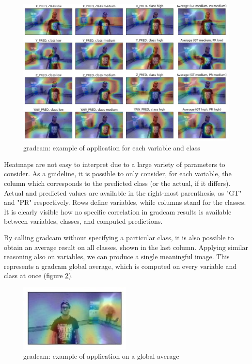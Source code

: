 \begin{figure}[!h]
	\centering
	\includegraphics[width=1\textwidth]{"contents/images/gradcam/04-gradcam-example-1"}
	\caption[\gls{gradcam}: example of application for each variable and class]{\gls{gradcam}: example of application for each variable and class}
	\label{fig:gradcam-example-1}
\end{figure}

Heatmaps are not easy to interpret due to a large variety of parameters to consider. As a guideline, it is possible to only consider, for each variable, the column which corresponds to the predicted class (or the actual, if it differs). Actual and predicted values are available in the right-most parenthesis, as "GT" and "PR" respectively. Rows define variables, while columns stand for the classes. It is clearly visible how no specific correlation in \gls{gradcam} results is available between variables, classes, and computed predictions.

By calling \gls{gradcam} without specifying a particular class, it is also possible to obtain an average result on all classes, shown in the last column. Applying similar reasoning also on variables, we can produce a single meaningful image. This represents a \gls{gradcam} global average, which is computed on every variable and class at once (figure \ref{fig:gradcam-example-2}).

\begin{figure}[!h]
	\centering
	\includegraphics[width=0.5\textwidth]{"contents/images/gradcam/04-gradcam-example-2"}
	\caption[\gls{gradcam}: example of application on a global average]{\gls{gradcam}: example of application on a global average}
	\label{fig:gradcam-example-2}
\end{figure}



